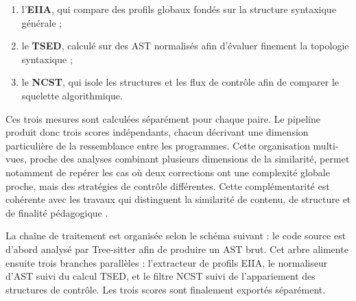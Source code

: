 \begin{enumerate}
    \item l'\textbf{EIIA}, qui compare des profils globaux fondés sur la
    structure syntaxique générale ;
    \item le \textbf{TSED}, calculé sur des AST normalisés afin d'évaluer
    finement la topologie syntaxique ;
    \item le \textbf{NCST}, qui isole les structures et les flux de contrôle
    afin de comparer le squelette algorithmique.
\end{enumerate}

Ces trois mesures sont calculées séparément pour chaque paire. Le pipeline
produit donc trois scores indépendants, chacun décrivant une dimension
particulière de la ressemblance entre les programmes. Cette organisation
multi-vues, proche des analyses combinant plusieurs dimensions de la
similarité, permet notamment de repérer les cas où deux corrections ont une
complexité globale proche, mais des stratégies de contrôle différentes.
Cette complémentarité est cohérente avec les travaux qui distinguent la
similarité de contenu, de structure et de finalité pédagogique
\cite{pelanek_2020,reddy_graph-based_2025}.

La chaîne de traitement est organisée selon le schéma suivant : le code
source est d'abord analysé par Tree-sitter afin de produire un AST brut. Cet
arbre alimente ensuite trois branches parallèles : l'extracteur de profils
EIIA, le normaliseur d'AST suivi du calcul TSED, et le filtre NCST suivi de
l'appariement des structures de contrôle. Les trois scores sont finalement
exportés séparément.

